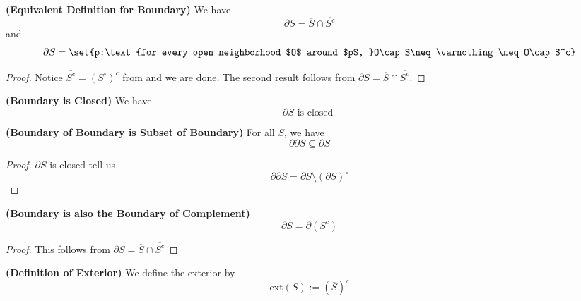 \documentclass{report}
\begin{document}
\begin{theorem}
\label{2.2.12}
\textbf{(Equivalent Definition for Boundary)} We have
\begin{equation*}
\partial S=\overline{S}\cap \overline{S^c}
\end{equation*}
and
\begin{equation*}
\partial S=\set{p:\text{for every open neighborhood $O$ around $p$, }O\cap S\neq \varnothing\neq O\cap S^c}
\end{equation*}
\end{theorem}
\begin{proof}
Notice $\overline{S^c}=(S^\circ )^c$ from  and we are done. The second result follows from $\partial S=\overline{S}\cap \overline{S^c}$.
\end{proof}
\begin{corollary}
\label{2.2.13}
\textbf{(Boundary is Closed)} We have
\begin{equation*}
\partial S\text{ is closed }
\end{equation*}
\end{corollary}
\begin{corollary}
\label{2.2.14}
\textbf{(Boundary of Boundary is Subset of Boundary)} For all $S$, we have
\begin{equation*}
\partial \partial S\subseteq \partial S
\end{equation*}
\end{corollary}
\begin{proof}
$\partial S$ is closed tell us
\begin{equation*}
\partial \partial S= \partial S\setminus (\partial S)^\circ 
\end{equation*}
\end{proof}
\begin{theorem}
\label{2.2.15}
\textbf{(Boundary is also the Boundary of Complement)} 
\begin{equation*}
\partial S=\partial (S^c)
\end{equation*}
\end{theorem}
\begin{proof}
This follows from $\partial S=\overline{S}\cap \overline{S^c}$
\end{proof}
\begin{definition}
\label{2.2.16}
\textbf{(Definition of Exterior)} We define the exterior by
\begin{equation*}
\text{ext}(S):=(\overline{S})^c
\end{equation*}
\end{definition}
\end{document}
